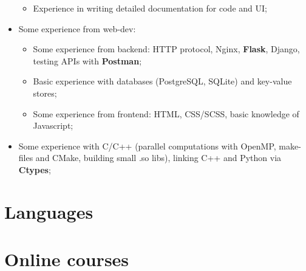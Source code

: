 \documentclass[12pt,a4paper,roman]{moderncv}
\begin{document}
\begin{itemize}
\begin{itemize}
        \item Experience in writing detailed documentation for code and UI; \newline
    \end{itemize}
 \item Some experience from web-dev: \newline
    \begin{itemize}
        \item Some experience from backend: 
          HTTP protocol, Nginx, \textbf{Flask}, Django, testing APIs with \textbf{Postman};\newline
        \item Basic experience with databases (PostgreSQL, SQLite) and key-value stores;\newline
        \item Some experience from frontend: HTML, CSS/SCSS, basic knowledge of Javascript; \newline
    \end{itemize}
 \item Some experience with C/C++ (parallel computations with OpenMP, make-files and CMake, building small .so libs), linking C++ and Python via \textbf{Ctypes}; \newline \newline
 \end{itemize} 
\section{Languages}
\section{Online courses}
\newline\newline
{} 
\end{document}
